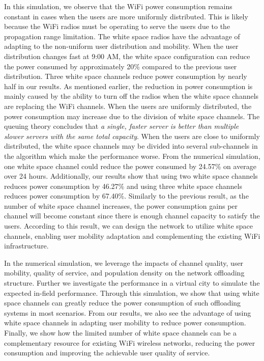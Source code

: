 In this simulation, we observe that the WiFi power consumption remains constant in cases when the users are more uniformly distributed. 
This is likely because the WiFi radios must be operating to serve the users due to the propagation range limitation. 
The white space radios have the advantage of adapting to the non-uniform user distribution and  mobility. 
When the user distribution changes fast at 9:00 AM, the white space configuration can reduce the power consumed by approximately 20\% compared to the previous user distribution. 
Three white space channels reduce power consumption by nearly half in our results. 
As mentioned earlier, the reduction in power consumption is mainly caused by the ability to turn off the radios when the white space channels are replacing the WiFi channels.
When the users are uniformly distributed, the power consumption may increase due to the division of white space channels. 
The queuing theory concludes that {\it a single, faster server is better than multiple slower servers with the same total capacity}. 
When the users are close to uniformly distributed, the white space channels may be divided into several sub-channels in the algorithm which make the performance worse. 
From the numerical simulation, one white space channel could reduce the power consumed by 24.57\% on average over 24 hours. 
Additionally, our results show that using two white space channels reduces power consumption by 46.27\% and using three white space channels reduces power consumption by 67.40\%. 
Similarly to the previous result, as the number of white space channel increases, the power consumption gains per channel will become constant since there is enough channel capacity to satisfy the users.
According to this result, we can design the network to utilize white space channels, enabling user mobility adaptation and complementing the existing WiFi infrastructure.


In the numerical simulation, we leverage the impacts of channel quality, user mobility, quality of service, and population density on the network offloading structure. 
Further we investigate the performance in a virtual city to simulate the expected in-field performance. 
Through this simulation, we show that using white space channels can greatly reduce the power consumption of such offloading systems in most scenarios. 
From our results, we also see the advantage of using white space channels in adapting user mobility to reduce power consumption. 
Finally, we show how the limited number of white space channels can be a complementary resource for existing WiFi wireless networks, reducing the power consumption and improving the achievable user quality of service. 
